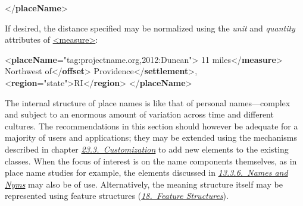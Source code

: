 \begin{shaded}
{</\textbf{placeName}>}\end{shaded}\egroup\par \noindent  If desired, the distance specified may be normalized using the {\itshape unit} and {\itshape quantity} attributes of \hyperref[TEI.measure]{<measure>}: \par\bgroup{}\exampleFont \begin{shaded}\noindent\mbox{}{<\textbf{placeName}\hspace*{1em}{ref}="{tag:projectname.org,2012:Duncan}">}\mbox{}\newline 
{}11 miles{</\textbf{measure}>}\mbox{}\newline 
{}Northwest of{</\textbf{offset}>}\mbox{}\newline 
{}Providence{</\textbf{settlement}>}, {<\textbf{region}\hspace*{1em}{type}="{state}">}RI{</\textbf{region}>}\mbox{}\newline 
{</\textbf{placeName}>}\end{shaded}\egroup\par \par
The internal structure of place names is like that of personal names—complex and subject to an enormous amount of variation across time and different cultures. The recommendations in this section should however be adequate for a majority of users and applications; they may be extended using the mechanisms described in chapter \textit{\hyperref[MD]{23.3.\ Customization}} to add new elements to the existing classes. When the focus of interest is on the name components themselves, as in place name studies for example, the elements discussed in \textit{\hyperref[NDNYM]{13.3.6.\ Names and Nyms}} may also be of use. Alternatively, the meaning structure itself may be represented using feature structures (\textit{\hyperref[FS]{18.\ Feature Structures}}).\par

